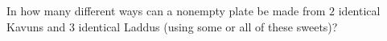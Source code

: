 In how many different ways can a nonempty plate be made from $2$ identical Kavuns and $3$ identical Laddus (using some or all of these sweets)?
